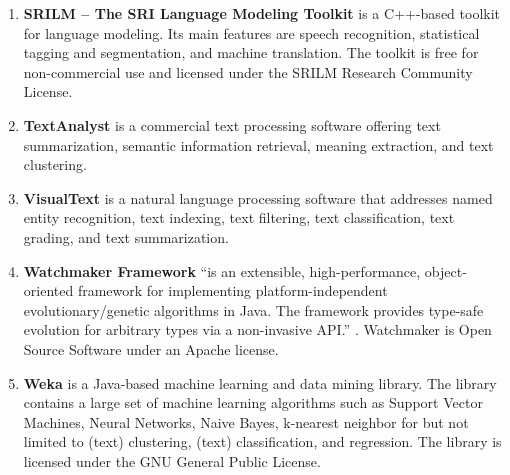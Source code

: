 \begin{enumerate}
	\item \textbf{SRILM -- The SRI Language Modeling Toolkit} \cite{stolcke2002srilm} is a C++-based toolkit for language modeling. Its main features are speech recognition, statistical tagging and segmentation, and machine translation.
The toolkit is free for non-commercial use and licensed under the SRILM Research Community License.

	\item \textbf{TextAnalyst} \cite{textanalyst} is a commercial text processing software offering text summarization, semantic information retrieval, meaning extraction, and text clustering.

	\item \textbf{VisualText} \cite{visualtext} is a natural language processing software that addresses named entity recognition, text indexing, text filtering, text classification, text grading, and text summarization.

	\item \textbf{Watchmaker Framework} ``is an extensible, high-performance, object-oriented framework for implementing platform-independent evolutionary/genetic algorithms in Java. The framework provides type-safe evolution for arbitrary types via a non-invasive API.'' \cite{watchmaker}. Watchmaker is Open Source Software under an Apache license.

	\item \textbf{Weka} \cite{hall2009weka} is a Java-based machine learning and data mining library. The library contains a large set of machine learning algorithms such as Support Vector Machines, Neural Networks, Naive Bayes, k-nearest neighbor for but not limited to (text) clustering, (text) classification, and regression.
The library is licensed under the GNU General Public License.

\end{enumerate}
